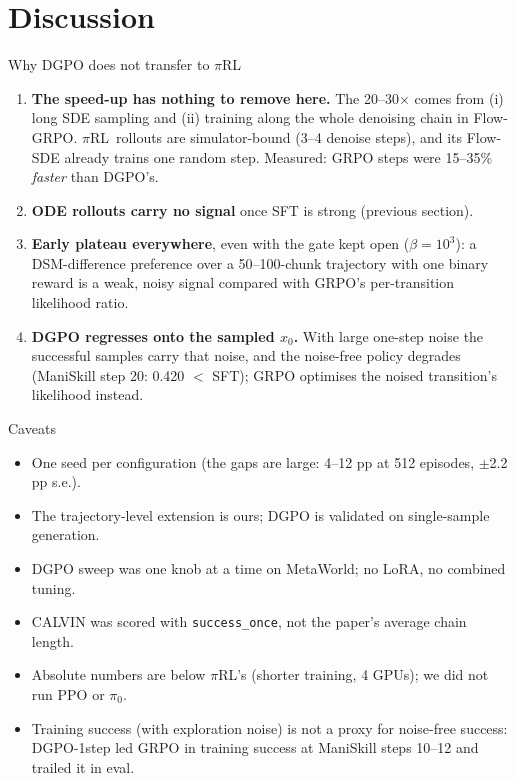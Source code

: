 \documentclass[aspectratio=169,11pt]{beamer}
\newcommand{\pirl}{$\pi$RL}
\newcommand{\pizero}{$\pi_0$}
\begin{document}
\section{Discussion}
\begin{frame}{Why DGPO does not transfer to \pirl}
  \small
  \begin{enumerate}
    \item \textbf{The speed-up has nothing to remove here.} The 20--30$\times$ comes from
          (i) long SDE sampling and (ii) training along the whole denoising chain in Flow-GRPO.
          \pirl\ rollouts are simulator-bound (3--4 denoise steps), and its Flow-SDE already trains
          one random step. Measured: GRPO steps were 15--35\% \emph{faster} than DGPO's.
    \item \textbf{ODE rollouts carry no signal} once SFT is strong (previous section).
    \item \textbf{Early plateau everywhere}, even with the gate kept open ($\beta=10^3$):
          a DSM-difference preference over a 50--100-chunk trajectory with one binary reward is a
          weak, noisy signal compared with GRPO's per-transition likelihood ratio.
    \item \textbf{DGPO regresses onto the sampled $x_0$.} With large one-step noise the successful
          samples carry that noise, and the noise-free policy degrades (ManiSkill step 20: 0.420 $<$ SFT);
          GRPO optimises the noised transition's likelihood instead.
  \end{enumerate}
\end{frame}

\begin{frame}{Caveats}
  \small
  \begin{itemize}
    \item One seed per configuration (the gaps are large: 4--12 pp at 512 episodes, $\pm$2.2 pp s.e.).
    \item The trajectory-level extension is ours; DGPO is validated on single-sample generation.
    \item DGPO sweep was one knob at a time on MetaWorld; no LoRA, no combined tuning.
    \item CALVIN was scored with \texttt{success\_once}, not the paper's average chain length.
    \item Absolute numbers are below \pirl's (shorter training, 4 GPUs); we did not run PPO or \pizero.
    \item Training success (with exploration noise) is not a proxy for noise-free success:
          DGPO-1step led GRPO in training success at ManiSkill steps 10--12 and trailed it in eval.
  \end{itemize}
\end{frame}
\end{document}
